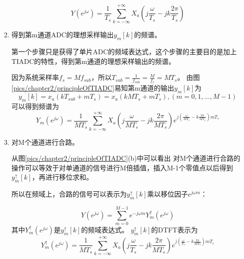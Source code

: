 \begin{enumerate}
				\begin{equation}
					Y\left( {{e^{j\omega }}} \right) = \frac{1}{{{T_s}}}\sum\limits_{k =  - \infty }^{ + \infty } {{X_a}\left( {j\frac{\omega }{{{T_s}}} - jk\frac{{2\pi }}{{{T_s}}}} \right)}  \label{Y_finalSingle}
				\end{equation}
				
		\item 得到第m通道ADC的理想采样输出$y_m[k]$的频谱。\par
			第一个步骤只是获得了单片ADC的频域表达式，这个步骤的主要目的是加上TIADC的特性，得到第m通道的理想采样输出的频谱。\par
			因为系统采样率$f_s=Mf_{sub}$，所以$T_{sub}=\frac{1}{f_{sub}}=\frac{M}{f_s}=MT_s$。
			由图\ref{pics/chapter2/principleOfTIADC}易知第m通道的输出$y_m[k]$为
				\begin{equation}
					{y_m}[k] = {x_a}\left( {k{T_{sub}} + m{T_s}} \right) = {x_a}(kM{T_s} + m{T_s}),\left( {m = 0,1, \ldots ,M - 1} \right)
				\end{equation}
			可以得到频谱为
				\begin{equation}
					{Y_m}\left( {{e^{j\omega }}} \right) = \frac{1}{{M{T_s}}}\sum\limits_{k =  - \infty }^{ + \infty } {{X_a}\left( {j\frac{\omega }{{M{T_s}}} - jk\frac{{2\pi }}{{M{T_s}}}} \right)} {e^{j\left( {\frac{\omega }{{M{T_s}}} - k\frac{{2\pi }}{{M{T_s}}}} \right)m{T_s}}}  \label{Y_m}
				\end{equation}
		\item 对M个通道进行合路。\par
			从图\ref{pics/chapter2/principleOfTIADC}(b)中可以看出
			对M个通道进行合路的操作可以等效于对单通道的信号进行M倍插值，插入M-1个零值点以后得到$y_m^ \uparrow [k]$，再进行移位求和。\par
			所以在频域上，合路的信号可以表示为$y_m^ \uparrow [k]$乘以移位因子$e^{j\omega m}$：

				\begin{equation}
					Y({e^{j\omega }}) = \sum\limits_{m = 0}^{M - 1} {{e^{ - j\omega m}}} Y_m^ \uparrow \left( {{e^{j\omega }}} \right) \label{Y_shift}
				\end{equation}
			其中$Y_m^ \uparrow \left( {{e^{j\omega }}} \right)$是$y_m^ \uparrow [k]$的频域表达式。
			$y_m^ \uparrow [k]$的DTFT表示为
				\begin{equation}
					Y_m^ \uparrow \left( {{e^{j\omega }}} \right) = \frac{1}{{M{T_s}}}\sum\limits_{k =  - \infty }^{ + \infty } {{X_a}\left( {j\frac{\omega }{{{T_s}}} - jk\frac{{2\pi }}{{M{T_s}}}} \right)} {e^{j\left( {\frac{\omega }{{{T_s}}} - k\frac{{2\pi }}{{M{T_s}}}} \right)m{T_s}}} \label{Y_mUpSample}
				\end{equation}
			

\end{enumerate}
